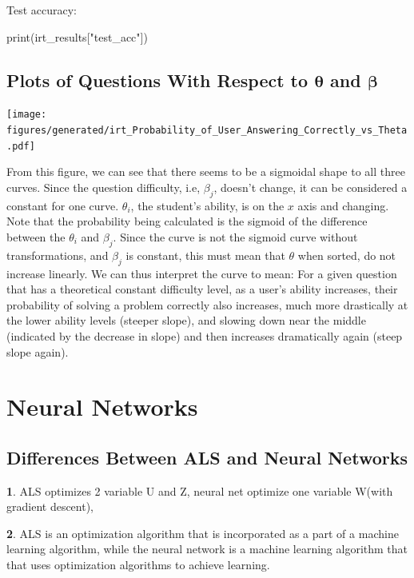 \documentclass{article}
\begin{document}
    \medskip

    \noindent
    Test accuracy:
    \begin{pylabblock}[IRT]
        print(irt_results["test_acc"])
    \end{pylabblock}
    \printpythontex[verb]

    \subsection{Plots of Questions With Respect to $\bm{\theta}$ and $\bm{\beta}$}

    \texttt{[image: figures/generated/irt\_Probability\_of\_User\_Answering\_Correctly\_vs\_Theta.pdf]}

    From this figure, we can see that there seems to be a sigmoidal shape to all three curves. Since the question difficulty, i.e, $\beta_j$, doesn't change, it can be considered a constant for one curve. $\theta_i$, the student's ability, is on the $x$ axis and changing. Note that the probability being calculated is the sigmoid of the difference between the $\theta_i$ and $\beta_j$. Since the curve is not the sigmoid curve without transformations, and $\beta_j$ is constant, this must mean that $\theta$ when sorted, do not increase linearly. We can thus interpret the curve to mean: For a given question that has a theoretical constant difficulty level, as a user's ability increases,  their probability of solving a problem correctly also increases, much more drastically at the lower ability levels (steeper slope), and slowing down near the middle (indicated by the decrease in slope) and then increases dramatically again (steep slope again).

    \pagebreak

    \section{Neural Networks}
    \subsection{Differences Between ALS and Neural Networks}
    
    \textbf{1}. ALS optimizes 2 variable U and Z, neural net optimize one variable W(with gradient descent),

    \textbf{2}. ALS is an optimization algorithm that is incorporated as a part of a machine learning algorithm, while the neural network is a machine learning algorithm that that uses optimization algorithms to achieve learning.
\end{document}
